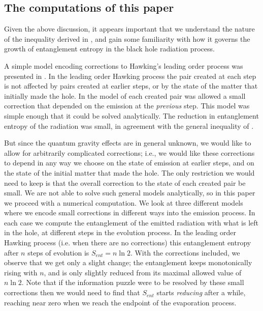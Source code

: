 \documentclass[11pt]{article}
\begin{document}
\subsection{The computations of this paper}

Given the above discussion, it appears important  that we understand the nature of the inequality derived in \cite{mathurfuzz}, and gain some familiarity with how it governs the growth of entanglement entropy in the black hole radiation process. 

A simple model encoding corrections to Hawking's leading order process was presented in \cite{mathurrecent}. In the leading order Hawking process the pair created at each step is not affected by pairs created at earlier steps, or by the state of the matter that initially made the hole. In the  model of \cite{mathurrecent} each created pair was allowed a small correction that depended on the emission at the {\it previous} step. This model was simple enough that it could be solved analytically. The reduction in entanglement entropy of the radiation was small, in agreement with the general inequality of \cite{mathurfuzz}. 

But since the quantum gravity effects are in general unknown, we would like to allow for arbitrarily complicated corrections; i.e., we would like these corrections to depend in any way we choose on the state of emission at earlier steps, and on the state of the initial matter that made the hole. The only restriction we would need to keep is that the overall correction to the state of each created pair be small. We are not able to solve such general models analytically, so in this paper we proceed with a numerical computation.  We look at three different models where we encode small corrections in different ways into the emission process. In each case we compute the entanglement of the emitted radiation with what is left in the hole, at different steps in the evolution process. In the leading order Hawking process (i.e. when there are no corrections) this entanglement entropy after $n$ steps of evolution is $S_{ent}=n\ln 2$. With the corrections included, we observe that we get only a slight change;  the entanglement keeps monotonically rising with $n$, and is only slightly reduced from its maximal allowed value of $n\ln 2$. Note that if the information puzzle were to be resolved by these small corrections then we would need to find that $S_{ent}$ starts {\it reducing} after a while, reaching near zero when we reach the endpoint of the evaporation process. 
\end{document}

